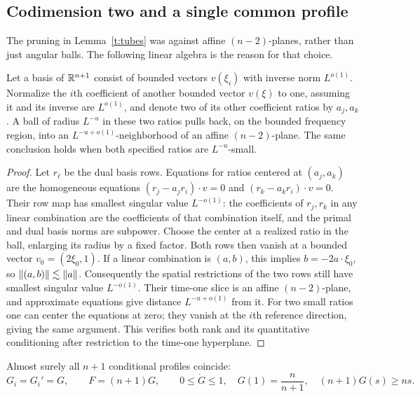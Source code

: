 \subsection{Codimension two and a single common profile}

The pruning in Lemma~\ref{t:tubes} was against affine $(n-2)$-planes,
rather than just angular balls.  The following linear algebra is the
reason for that choice.

\begin{lemma}\label{t:rank}
Let a basis of $\mathbb R^{n+1}$ consist of bounded vectors $v(\xi_i)$ with
inverse norm $L^{o(1)}$.  Normalize the $i$th coefficient of another
bounded vector $v(\xi)$ to one, assuming it and its inverse are
$L^{o(1)}$, and denote two of its other coefficient ratios by $a_j,a_k$.
A ball of radius $L^{-u}$ in these two ratios pulls back, on the bounded
frequency region, into an $L^{-u+o(1)}$-neighborhood of an affine
$(n-2)$-plane.  The same conclusion holds when both specified ratios
are $L^{-u}$-small.
\end{lemma}

\begin{proof}
Let $r_\ell$ be the dual basis rows.  Equations for ratios centered at
$(a_j,a_k)$ are the homogeneous equations
$(r_j-a_jr_i)\cdot v=0$ and $(r_k-a_kr_i)\cdot v=0$.
Their row map has smallest singular value $L^{-o(1)}$: the coefficients
of $r_j,r_k$ in any linear combination are the coefficients of that
combination itself, and the primal and dual basis norms are subpower.
Choose the center at a realized ratio in the ball, enlarging its radius
by a fixed factor.  Both rows then vanish at a bounded vector
$v_0=(2\xi_0,1)$.  If a linear combination is $(a,b)$, this implies
$b=-2a\cdot\xi_0$, so $\lVert (a,b)\rVert\lesssim\lVert a\rVert$.
Consequently the spatial restrictions of the two rows still have
smallest singular value $L^{-o(1)}$.  Their time-one slice is an affine
$(n-2)$-plane, and approximate equations give distance
$L^{-u+o(1)}$ from it.  For two small ratios one can center the equations
at zero; they vanish at the $i$th reference direction, giving the same
argument.  This verifies both rank and its quantitative conditioning
after restriction to the time-one hyperplane.
\end{proof}

\begin{lemma}\label{t:common}
Almost surely all $n+1$ conditional profiles coincide:
\begin{equation}\label{t:common-profile}
 G_i=G_i'=G,\qquad F=(n+1)G,\qquad
 0\le\dot G\le1,\quad G(1)=\frac n{n+1},\quad
 (n+1)G(s)\ge ns.
\end{equation}
\end{lemma}

